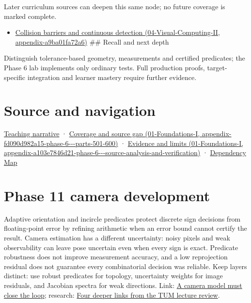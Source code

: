 Later curriculum sources can deepen this same node; no future coverage is marked complete.

\begin{itemize}
\tightlist
\item
  \href{../04-Visual-Computing-II/main.pdf\#nameddest=appendix-a9ba01fa72a6}{Collision barriers and continuous detection (04-Visual-Computing-II, appendix-a9ba01fa72a6)} \#\# Recall and next depth
\end{itemize}

Distinguish tolerance-based geometry, measurements and certified predicates; the Phase 6 lab implements only ordinary tests. Full production proofs, target-specific integration and learner mastery require further evidence.

\section{Source and navigation}\label{appendix-341296fb3f64-source-and-navigation}

\href{Continuous\%20Notes/Computing\%20Foundations\%20-\%20From\%20Bits\%20to\%20C++\%20and\%20Systems\%20APIs\#The\%20sensor\%20needs\%20coordinates\%20inside\%20the\%20triangle}{Teaching narrative} · \href{../01-Foundations-I/main.pdf\#nameddest=appendix-fd090d982a15-phase-6---parts-501-600}{Coverage and source gap (01-Foundations-I, appendix-fd090d982a15-phase-6-\/-\/-parts-501-600)} · \href{../01-Foundations-I/main.pdf\#nameddest=appendix-a103e7846d21-phase-6---source-analysis-and-verification}{Evidence and limits (01-Foundations-I, appendix-a103e7846d21-phase-6-\/-\/-source-analysis-and-verification)} · \hyperref[appendix-4ad47bdd269a]{Dependency Map}

\section{Phase 11 camera development}\label{appendix-341296fb3f64-phase-11-camera-development}

Adaptive orientation and incircle predicates protect discrete sign decisions from floating-point error by refining arithmetic when an error bound cannot certify the result. Camera estimation has a different uncertainty: noisy pixels and weak observability can leave pose uncertain even when every sign is exact. Predicate robustness does not improve measurement accuracy, and a low reprojection residual does not guarantee every combinatorial decision was reliable. Keep layers distinct: use robust predicates for topology, uncertainty weights for image residuals, and Jacobian spectra for weak directions. Link: \href{Continuous\%20Notes/Computing\%20Foundations\%20-\%20From\%20Bits\%20to\%20C++\%20and\%20Systems\%20APIs\#A\%20camera\%20model\%20must\%20close\%20the\%20loop}{A camera model must close the loop}; research: \href{Continuous\%20Notes/Computing\%20Foundations\%20-\%20From\%20Bits\%20to\%20C++\%20and\%20Systems\%20APIs\#Four\%20deeper\%20links\%20from\%20the\%20TUM\%20lecture\%20review}{Four deeper links from the TUM lecture review}.
